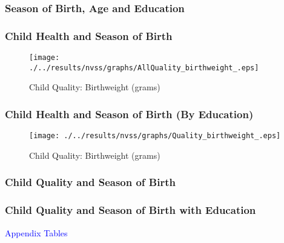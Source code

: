 \documentclass[10pt,letterpaper,subeqn]{beamer}
\begin{document}
\begin{frame}[label=single]

\hyperlink{twin}{}
\end{frame}

\begin{frame}[label=NVSSseason]
\frametitle{Season of Birth, Age and Education}

\end{frame}

\begin{frame}[label=IPUMSseason]

\end{frame}

\begin{frame}[label=IPUMSseasonSingle]

\end{frame}

\begin{frame}[label=Bwt]
\frametitle{Child Health and Season of Birth}
\begin{figure}
  \texttt{[image: ./../results/nvss/graphs/AllQuality\_birthweight\_.eps]}
  \caption{Child Quality: Birthweight (grams)}
  \label{fig:Bwt}
\end{figure}
\end{frame}

\begin{frame}[label=Bwt]
\frametitle{Child Health and Season of Birth (By Education)}
\begin{figure}
  \texttt{[image: ./../results/nvss/graphs/Quality\_birthweight\_.eps]}
  \caption{Child Quality: Birthweight (grams)}
  \label{fig:BwtEduc}
\end{figure}
\end{frame}


\begin{frame}[label=Quality]
\frametitle{Child Quality and Season of Birth}

\end{frame}

\begin{frame}[label=Quality]
\frametitle{Child Quality and Season of Birth with Education}

\end{frame}




\begin{frame}
\begin{center}
\large \textcolor{blue}{Appendix Tables}
\end{center}
\end{frame}


\begin{frame}[label=twin]

\hyperlink{single}{}
\end{frame}
\end{document}

